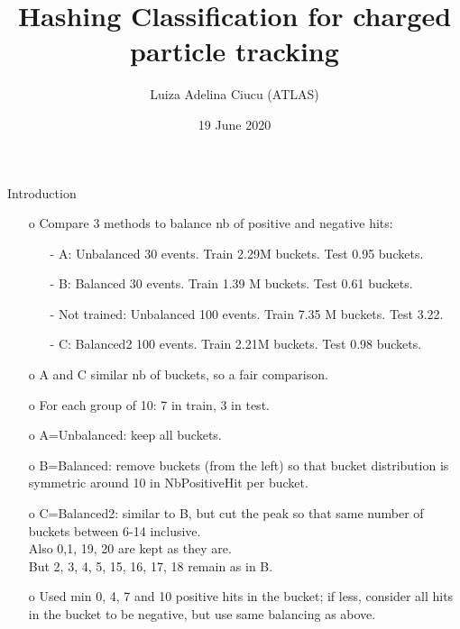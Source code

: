 \documentclass{beamer}
\title[Hashing classification for tracking ]{Hashing Classification for charged particle tracking}
\author[Luiza Adelina Ciucu (ATLAS) ]{Luiza Adelina Ciucu (ATLAS)}
\date{19 June 2020}
\begin{document}
\frame{\titlepage}


\newcommand\inputFolderMergedOld{../backup_01/output_new_ev_000_030}
\newcommand\inputFolderOverlayOld{../backup_01/output_overlay_balanced_ev_000_030}
\newcommand\inputFolderMerged{../output_new_ev_000_100}
\newcommand\inputFolderOverlay{../output_overlay_balanced_ev_000_100}


\def\volumeID{\texttt{\detokenize{volume_id}}}
\def\layerID{\texttt{\detokenize{layer_id}}}

\def\TP{\ifmmode {\mathrm{TP}}\else
                   \textrm{TP}\fi}%
\def\FP{\ifmmode {\mathrm{FP}}\else
                   \textrm{FP}\fi}%
\def\FN{\ifmmode {\mathrm{FN}}\else
                   \textrm{FN}\fi}%
\def\TN{\ifmmode {\mathrm{TN}}\else
                   \textrm{TN}\fi}%

\begin{frame}{Introduction}
\begin{enumerate}
\item[o] Compare 3 methods to balance nb of positive and negative hits: 
\begin{enumerate}
\item[-] A: Unbalanced 30 events. Train 2.29M buckets. Test 0.95 buckets. 
\item[-] B: Balanced 30 events. Train 1.39 M buckets. Test 0.61 buckets. 
\item[-] Not trained: Unbalanced 100 events. Train 7.35 M buckets. Test 3.22. 
\item[-] C: Balanced2 100 events. Train 2.21M buckets. Test 0.98 buckets. 
\end{enumerate}
\item[o] A and C similar nb of buckets, so a fair comparison.
\item[o] For each group of 10: 7 in train, 3 in test. 
\item[o] A=Unbalanced: keep all buckets.
\item[o] B=Balanced: remove buckets (from the left) so that bucket distribution is symmetric around 10 in NbPositiveHit per bucket.
\item[o] C=Balanced2: similar to B, but cut the peak so that same number of buckets between 6-14 inclusive. \\ Also 0,1, 19, 20 are kept as they are. \\ But 2, 3, 4, 5, 15, 16, 17, 18 remain as in B. 
\item[o] Used min 0, 4, 7 and 10 positive hits in the bucket; if less, consider all hits in the bucket to be negative, but use same balancing as above.
\end{enumerate}
\end{frame}
\clearpage
\end{document}
